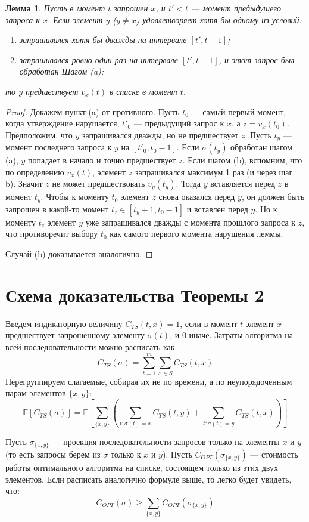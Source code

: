 \documentclass[12pt, a4paper]{article}
\newtheorem{lemma}{Лемма}
\begin{document}
\begin{lemma}
Пусть в момент $t$ запрошен $x$, и $t' < t$ --- момент предыдущего запроса к $x$. Если элемент $y$ ($y \neq x$) удовлетворяет хотя бы одному из условий:
\begin{enumerate}
    \item[(a)] запрашивался хотя бы дважды на интервале $[t', t-1]$;
    \item[(b)] запрашивался ровно один раз на интервале $[t', t-1]$, и этот запрос был обработан Шагом (a);
\end{enumerate}
то $y$ предшествует $v_x(t)$ в списке в момент $t$.
\end{lemma}
\begin{proof}
Докажем пункт (a) от противного. Пусть $t_0$ --- самый первый момент, когда утверждение нарушается, $t'_0$ --- предыдущий запрос к $x$, а $z = v_x(t_0)$. Предположим, что $y$ запрашивался дважды, но не предшествует $z$. Пусть $t_y$ --- момент последнего запроса к $y$ на $[t'_0, t_0-1]$. 
Если $\sigma(t_y)$ обработан шагом (a), $y$ попадает в начало и точно предшествует $z$. Если шагом (b), вспомним, что по определению $v_x(t)$, элемент $z$ запрашивался максимум 1 раз (и через шаг b). Значит $z$ не может предшествовать $v_y(t_y)$. Тогда $y$ вставляется перед $z$ в момент $t_y$. 
Чтобы к моменту $t_0$ элемент $z$ снова оказался перед $y$, он должен быть запрошен в какой-то момент $t_z \in [t_y+1, t_0-1]$ и вставлен перед $y$. Но к моменту $t_z$ элемент $y$ уже запрашивался дважды с момента прошлого запроса к $z$, что противоречит выбору $t_0$ как самого первого момента нарушения леммы.

Случай (b) доказывается аналогично.
\end{proof}

\section{Схема доказательства Теоремы 2}
Введем индикаторную величину $C_{TS}(t, x) = 1$, если в момент $t$ элемент $x$ предшествует запрошенному элементу $\sigma(t)$, и $0$ иначе. Затраты алгоритма на всей последовательности можно расписать как:
$$C_{TS}(\sigma) = \sum_{t=1}^m \sum_{x \in S} C_{TS}(t, x)$$
Перегруппируем слагаемые, собирая их не по времени, а по неупорядоченным парам элементов $\{x, y\}$:
$$\mathbb{E}[C_{TS}(\sigma)] = \mathbb{E}\left[ \sum_{\{x,y\}} \left( \sum_{t:\sigma(t)=x} C_{TS}(t, y) + \sum_{t:\sigma(t)=y} C_{TS}(t, x) \right) \right]$$

Пусть $\sigma_{\{x,y\}}$ --- проекция последовательности запросов только на элементы $x$ и $y$ (то есть запросы берем из $\sigma$ только к $x$ и $y$). Пусть $\bar{C}_{OPT}(\sigma_{\{x,y\}})$ --- стоимость работы оптимального алгоритма на списке, состоящем только из этих двух элементов. Если расписать аналогично формуле выше, то легко будет увидеть, что:
$$C_{OPT}(\sigma) \ge \sum_{\{x,y\}} \bar{C}_{OPT}(\sigma_{\{x,y\}})$$
\end{document}
